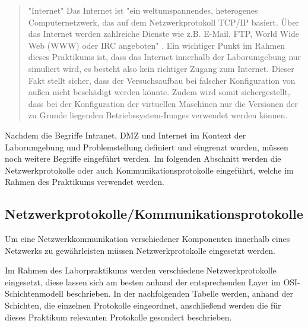 \documentclass[
a4paper,     %
 headsepline, %
footsepline, %
titlepage,   %
 halfparskip,     %
 fleqn,       %
12pt         %
]{scrartcl}  %
\begin{document}
\begin{quotation}
\item["Internet"]
Das Internet ist "ein weltumspannendes, heterogenes Computernetzwerk, das auf dem Netzwerkprotokoll TCP/IP basiert. Über das Internet werden zahlreiche Dienste wie z.B. E-Mail, FTP, World Wide Web (WWW) oder IRC angeboten" \cite{Gab-Internet}. Ein wichtiger Punkt im Rahmen dieses Praktikums ist, dass das Internet innerhalb der Laborumgebung nur simuliert wird, es besteht also kein richtiger Zugang zum Internet. Dieser Fakt stellt sicher, dass der Versuchsaufbau bei falscher Konfiguration von außen nicht beschädigt werden könnte. Zudem wird somit sichergestellt, dass bei der Konfiguration der virtuellen Maschinen nur die Versionen der zu Grunde liegenden Betriebssystem-Images verwendet werden können. 

\end{quotation}

Nachdem die Begriffe Intranet, DMZ und Internet im Kontext der Laborumgebung und Problemstellung definiert und eingrenzt wurden, müssen noch weitere Begriffe eingeführt werden. Im folgenden Abschnitt werden die Netzwerkprotokolle oder auch Kommunikationsprotokolle eingeführt, welche im Rahmen des Praktikums verwendet werden. 

\subsection{Netzwerkprotokolle/Kommunikationsprotokolle} 
Um eine Netzwerkkommunikation verschiedener Komponenten innerhalb eines Netzwerks zu gewährleisten müssen Netzwerkprotokolle eingesetzt werden. 

Im Rahmen des Laborpraktikums werden verschiedene Netzwerkprotokolle eingesetzt, diese lassen sich am besten anhand der entsprechenden Layer im OSI-Schichtenmodell beschrieben. 
In der nachfolgenden Tabelle werden, anhand der Schichten, die einzelnen Protokolle eingeordnet, anschließend werden die für dieses Praktikum relevanten Protokolle gesondert beschrieben. 
\end{document}
